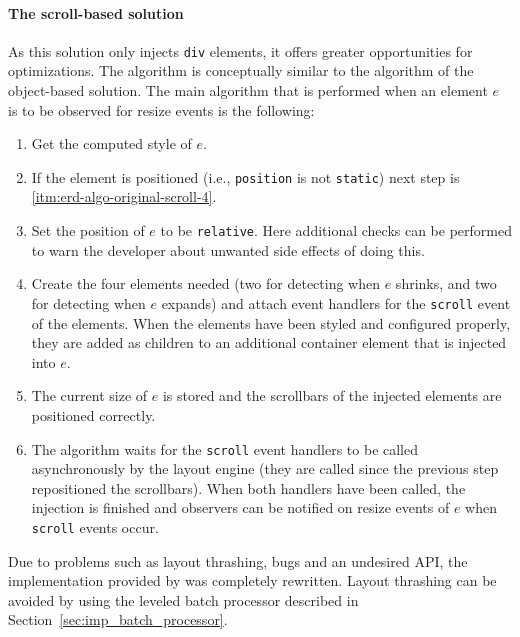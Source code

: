 \documentclass[a4paper,11pt]{kth-mag}
\newcommand{\code}[1]{\texttt{#1}}
\begin{document}
        \paragraph{The scroll-based solution}
        As this solution only injects \code{div} elements, it offers greater opportunities for optimizations.
        The algorithm is conceptually similar to the algorithm of the object-based solution.
        The main algorithm that is performed when an element $e$ is to be observed for resize events is the following:
        \begin{enumerate}
          \item\label{itm:erd-algo-original-scroll-1} Get the computed style of $e$.
          \item\label{itm:erd-algo-original-scroll-2} If the element is positioned (i.e., \code{position} is not \code{static}) next step is \ref{itm:erd-algo-original-scroll-4}.
          \item\label{itm:erd-algo-original-scroll-3} Set the position of $e$ to be \code{relative}. Here additional checks can be performed to warn the developer about unwanted side effects of doing this.
          \item\label{itm:erd-algo-original-scroll-4} Create the four elements needed (two for detecting when $e$ shrinks, and two for detecting when $e$ expands) and attach event handlers for the \code{scroll} event of the elements.
                                                      When the elements have been styled and configured properly, they are added as children to an additional container element that is injected into $e$.
          \item\label{itm:erd-algo-original-scroll-5} The current size of $e$ is stored and the scrollbars of the injected elements are positioned correctly.
          \item\label{itm:erd-algo-original-scroll-6} The algorithm waits for the \code{scroll} event handlers to be called asynchronously by the layout engine (they are called since the previous step repositioned the scrollbars).
                                                      When both handlers have been called, the injection is finished and observers can be notified on resize events of $e$ when \code{scroll} events occur.
        \end{enumerate}
        Due to problems such as layout thrashing, bugs and an undesired \gls{API}, the implementation provided by \cite{eq_imp_css-element-queries} was completely rewritten.
        Layout thrashing can be avoided by using the leveled batch processor described in Section~\ref{sec:imp_batch_processor}.
\end{document}
